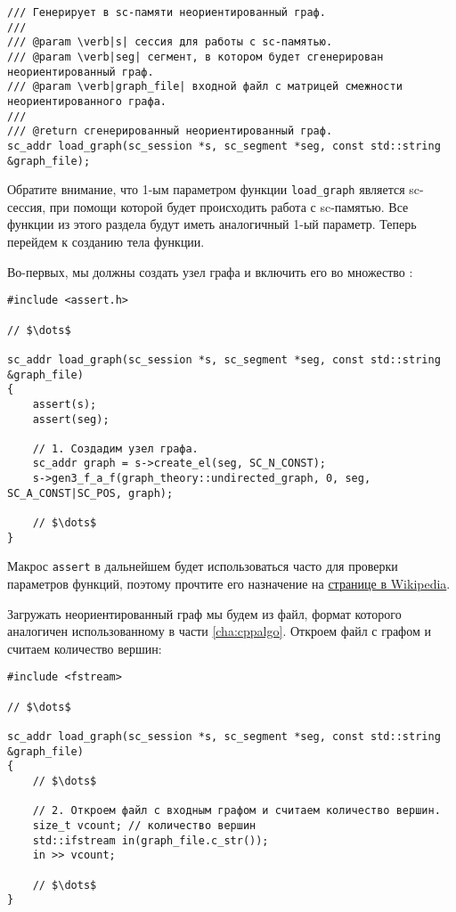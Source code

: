 \begin{lstlisting}[texcl]
/// Генерирует в sc-памяти неориентированный граф.
///
/// @param \verb|s| сессия для работы с sc-памятью.
/// @param \verb|seg| сегмент, в котором будет сгенерирован неориентированный граф.
/// @param \verb|graph_file| входной файл с матрицей смежности неориентированного графа.
///
/// @return сгенерированный неориентированный граф.
sc_addr load_graph(sc_session *s, sc_segment *seg, const std::string &graph_file);
\end{lstlisting}

Обратите внимание, что 1-ым параметром функции \lstinline|load_graph|
является sc-сессия, при помощи которой будет происходить работа с
sc-памятью. Все функции из этого раздела будут иметь аналогичный 1-ый
параметр. Теперь перейдем к созданию тела функции.

Во-первых, мы должны создать узел графа и включить его во множество
:

\begin{lstlisting}[texcl]
#include <assert.h>

// $\dots$

sc_addr load_graph(sc_session *s, sc_segment *seg, const std::string &graph_file)
{
    assert(s);
    assert(seg);

    // 1. Создадим узел графа.
    sc_addr graph = s->create_el(seg, SC_N_CONST);
    s->gen3_f_a_f(graph_theory::undirected_graph, 0, seg, SC_A_CONST|SC_POS, graph);

    // $\dots$
}
\end{lstlisting}

Макрос \lstinline|assert| в дальнейшем будет использоваться часто для
проверки параметров функций, поэтому прочтите его назначение на
\href{http://ru.wikipedia.org/wiki/Assert}{странице в Wikipedia}.

Загружать неориентированный граф мы будем из файл, формат которого
аналогичен использованному в части \ref{cha:cppalgo}. Откроем файл с
графом и считаем количество вершин:

\begin{lstlisting}[texcl]
#include <fstream>

// $\dots$

sc_addr load_graph(sc_session *s, sc_segment *seg, const std::string &graph_file)
{
    // $\dots$

    // 2. Откроем файл с входным графом и считаем количество вершин.
    size_t vcount; // количество вершин
    std::ifstream in(graph_file.c_str());
    in >> vcount;

    // $\dots$
}
\end{lstlisting}

